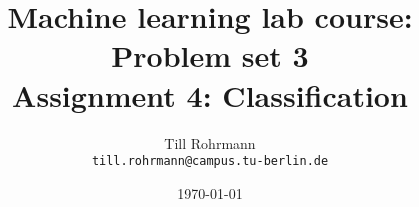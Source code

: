 
\usepackage[utf8]{inputenc}
\usepackage[T1]{fontenc}
\usepackage{lmodern}
\usepackage{amsthm}
\usepackage{amsmath}
\usepackage{graphicx}
\usepackage{float}
\usepackage{caption}
\usepackage{algorithm,algorithmic}
\usepackage{dsfont}

\title{Machine learning lab course: Problem set 3\\
Assignment 4: Classification}
\author[T. Rohrmann]{Till Rohrmann\\
\texttt{till.rohrmann@campus.tu-berlin.de}}
\date{\today}
\subject{Classification}


		\frame{\titlepage}
		

